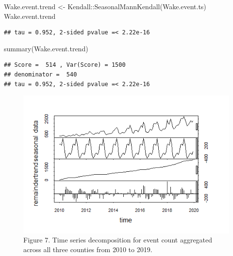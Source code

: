 \documentclass[
  12pt,
]{article}
\newenvironment{Shaded}{\begin{snugshade}}{\end{snugshade}}
\newcommand{\FunctionTok}[1]{\textcolor[rgb]{0.00,0.00,0.00}{#1}}
\newcommand{\NormalTok}[1]{#1}
\newcommand{\OtherTok}[1]{\textcolor[rgb]{0.56,0.35,0.01}{#1}}
\newcommand{\SpecialCharTok}[1]{\textcolor[rgb]{0.00,0.00,0.00}{#1}}
\begin{document}
\begin{Shaded}
\begin{Highlighting}[]
\NormalTok{Wake.event.trend }\OtherTok{\textless{}{-}}\NormalTok{ Kendall}\SpecialCharTok{::}\FunctionTok{SeasonalMannKendall}\NormalTok{(Wake.event.ts) }
\NormalTok{Wake.event.trend}
\end{Highlighting}
\end{Shaded}

\begin{verbatim}
## tau = 0.952, 2-sided pvalue =< 2.22e-16
\end{verbatim}

\begin{Shaded}
\begin{Highlighting}[]
\FunctionTok{summary}\NormalTok{(Wake.event.trend)}
\end{Highlighting}
\end{Shaded}

\begin{verbatim}
## Score =  514 , Var(Score) = 1500
## denominator =  540
## tau = 0.952, 2-sided pvalue =< 2.22e-16
\end{verbatim}

\begin{figure}
\centering
\includegraphics{./Output/RT_event_ts_decomp.png}
\caption{Figure 7. Time series decomposition for event count aggregated
across all three counties from 2010 to 2019.}
\end{figure}
\end{document}
